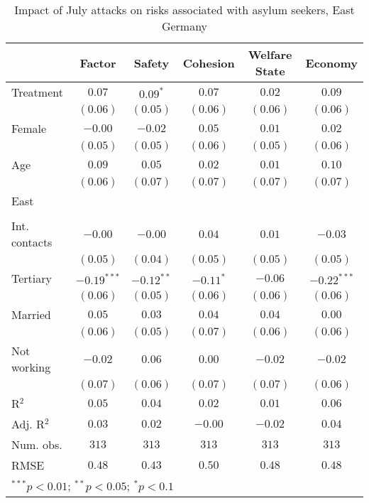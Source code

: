 
\begin{table}
\caption{Impact of July attacks on risks associated with asylum seekers, East Germany}
\begin{center}
\begin{tabular}{l c c c c c}
\toprule
 & Factor & Safety & Cohesion & Welfare State & Economy \\
\midrule
Treatment     & $0.07$        & $0.09^{*}$   & $0.07$      & $0.02$   & $0.09$        \\
              & $(0.06)$      & $(0.05)$     & $(0.06)$    & $(0.06)$ & $(0.06)$      \\
Female        & $-0.00$       & $-0.02$      & $0.05$      & $0.01$   & $0.02$        \\
              & $(0.05)$      & $(0.05)$     & $(0.06)$    & $(0.05)$ & $(0.06)$      \\
Age           & $0.09$        & $0.05$       & $0.02$      & $0.01$   & $0.10$        \\
              & $(0.06)$      & $(0.07)$     & $(0.07)$    & $(0.07)$ & $(0.07)$      \\
East          &               &              &             &          &               \\
              &               &              &             &          &               \\
Int. contacts & $-0.00$       & $-0.00$      & $0.04$      & $0.01$   & $-0.03$       \\
              & $(0.05)$      & $(0.04)$     & $(0.05)$    & $(0.05)$ & $(0.05)$      \\
Tertiary      & $-0.19^{***}$ & $-0.12^{**}$ & $-0.11^{*}$ & $-0.06$  & $-0.22^{***}$ \\
              & $(0.06)$      & $(0.05)$     & $(0.06)$    & $(0.06)$ & $(0.06)$      \\
Married       & $0.05$        & $0.03$       & $0.04$      & $0.04$   & $0.00$        \\
              & $(0.06)$      & $(0.05)$     & $(0.07)$    & $(0.06)$ & $(0.06)$      \\
Not working   & $-0.02$       & $0.06$       & $0.00$      & $-0.02$  & $-0.02$       \\
              & $(0.07)$      & $(0.06)$     & $(0.07)$    & $(0.07)$ & $(0.06)$      \\
\midrule
R$^2$         & $0.05$        & $0.04$       & $0.02$      & $0.01$   & $0.06$        \\
Adj. R$^2$    & $0.03$        & $0.02$       & $-0.00$     & $-0.02$  & $0.04$        \\
Num. obs.     & $313$         & $313$        & $313$       & $313$    & $313$         \\
RMSE          & $0.48$        & $0.43$       & $0.50$      & $0.48$   & $0.48$        \\
\bottomrule
\multicolumn{6}{l}{\scriptsize{$^{***}p<0.01$; $^{**}p<0.05$; $^{*}p<0.1$}}
\end{tabular}
\label{tab_risk_east}
\end{center}
\end{table}
